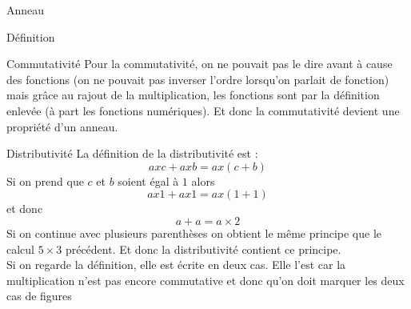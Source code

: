 \begin{parag}{Anneau}
\begin{subparag}{Définition}
    \end{subparag}
    \begin{subparag}{Commutativité}
        Pour la commutativité, on ne pouvait pas le dire avant à cause des fonctions (on ne pouvait pas inverser l'ordre lorsqu'on parlait de fonction) mais grâce au rajout de la multiplication, les fonctions sont par la définition enlevée (à part les fonctions numériques). Et donc la commutativité devient une propriété d'un anneau.        
    \end{subparag}
    \begin{subparag}{Distributivité}
        La définition de la distributivité est :
        \[axc + axb = ax(c + b)\]
        Si on prend que $c$ et $b$ soient égal à $1$ alors
        \[ax1 + ax1 = ax(1+1)\]
        et donc
        \[a + a = a \times 2\]
        Si on continue avec plusieurs parenthèses on obtient le même principe que le calcul $5 \times 3$ précédent. Et donc la distributivité contient ce principe.
        \\
        Si on regarde la définition, elle est écrite en deux cas. Elle l'est car la multiplication n'est pas encore commutative et donc qu'on doit marquer les deux cas de figures
    \end{subparag}
\end{parag}
